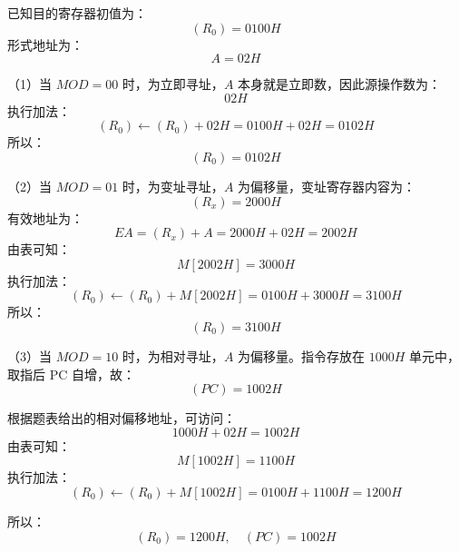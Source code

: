 \begin{analysisenv}
已知目的寄存器初值为：
\[
(R_0)=0100H
\]
形式地址为：
\[
A=02H
\]

（1）当 $MOD=00$ 时，为立即寻址，$A$ 本身就是立即数，因此源操作数为：
\[
02H
\]
执行加法：
\[
(R_0)\leftarrow (R_0)+02H=0100H+02H=0102H
\]
所以：
\[
(R_0)=0102H
\]

（2）当 $MOD=01$ 时，为变址寻址，$A$ 为偏移量，变址寄存器内容为：
\[
(R_x)=2000H
\]
有效地址为：
\[
EA=(R_x)+A=2000H+02H=2002H
\]
由表可知：
\[
M[2002H]=3000H
\]
执行加法：
\[
(R_0)\leftarrow (R_0)+M[2002H]=0100H+3000H=3100H
\]
所以：
\[
(R_0)=3100H
\]

（3）当 $MOD=10$ 时，为相对寻址，$A$ 为偏移量。指令存放在 $1000H$ 单元中，取指后 PC 自增，故：
\[
(PC)=1002H
\]

根据题表给出的相对偏移地址，可访问：
\[
1000H+02H=1002H
\]
由表可知：
\[
M[1002H]=1100H
\]
执行加法：
\[
(R_0)\leftarrow (R_0)+M[1002H]=0100H+1100H=1200H
\]

所以：
\[
(R_0)=1200H,\quad (PC)=1002H
\]
\end{analysisenv}
